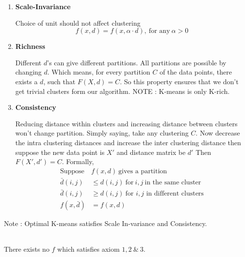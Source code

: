 \begin{enumerate}
\item \textbf{Scale-Invariance}

  Choice of unit should not affect clustering
  $$f(x,d)=f(x,\alpha\cdot d),\ \text{for any}\ \alpha>0$$
\item \textbf{Richness}

  Different $d$'s can give different partitions. All partitions are
  possible by changing $d$. Which means, for every partition $C$ of the data points, there exists a $d$, such that $F(X,d) = C$. So this property ensures that we don't get trivial clusters form our algorithm. NOTE : K-means is only K-rich.
\item \textbf{Consistency}

  Reducing distance within clusters and increasing distance between
  clusters won't change partition. Simply saying, take any clustering $C$. Now decrease the intra clustering distances and increase the inter clustering distance then suppose the new data point is $X'$ and distance matrix be $d'$ Then $F(X',d') = C$. Formally,
  \begin{align*}
    \text{Suppose}\ &f(x,d)\ \textrm{gives a partition}\\ 
    \bar{d}(i,j)&\leq
    d(i,j)\ \text{for}\ i,j\ \textrm{in the same cluster}\\ 
    \bar{d}(i,j)&\geq d(i,j)\ \textrm{for $i,j$ in different clusters}\\
    f(x,\bar{d})&=f(x,d)
  \end{align*}
\end{enumerate}
  
  Note : Optimal K-means satisfies Scale In-variance and Consistency.\\\\

\begin{theorem}
  There exists no $f$ which satisfies axiom $1,2~\&~3$.
\end{theorem}

